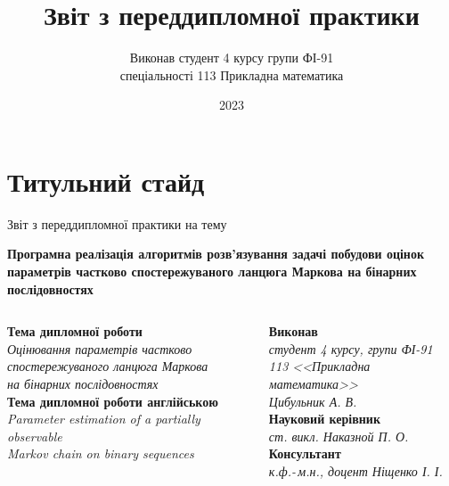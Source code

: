 \documentclass[12pt,mathserif]{beamer}
\title{Звіт з переддипломної практики}
\author{Виконав студент 4 курсу групи ФІ-91 \\
спеціальності 113 Прикладна математика}
\institute[НТУУ <<КПІ ім. Ігоря Сікорського>> НН ФТІ ММАД]{НТУУ <<КПІ ім. Ігоря Сікорського>> НН ФТІ ММАД}
\date{2023}
\theoremstyle{plain}
\begin{document}
\section{Титульний стайд}

\begin{frame}
    \vspace{0.5cm}
    \begin{center}
        Звіт з переддипломної практики на тему
    \end{center}
    \begin{block}{}\centering\bfseries
        Програмна реалізація алгоритмів розв'язування задачі побудови оцінок параметрів частково спостережуваного ланцюга Маркова на бінарних послідовностях 
    \end{block}
    \vspace{1cm}
    \begin{columns}[t]
        \begin{column}{0.64\linewidth}
            \scriptsize
            \textbf{Тема дипломної роботи} \\
            \textit{Оцінювання параметрів частково \\ спостережуваного ланцюга Маркова \\ на бінарних послідовностях} \\ \vspace{2mm}
            \textbf{Тема дипломної роботи англійською} \\
            \textit{Parameter estimation of a partially observable \\ Markov chain on binary sequences}
        \end{column}
        \begin{column}{0.36\linewidth}
            \scriptsize
            \textbf{Виконав} \\
            \textit{студент 4 курсу, групи ФІ-91} \\
            \textit{113 <<Прикладна математика>>} \\
            \textit{Цибульник А. В.} \\ \vspace{2mm}
            \textbf{Науковий керівник} \\
            \textit{ст. викл. Наказной П. О.} \\ \vspace{2mm}
            \textbf{Консультант} \\
            \textit{к.ф.-\,м.н., доцент Ніщенко І. І.}
        \end{column}
    \end{columns}
\end{frame}
\end{document}

